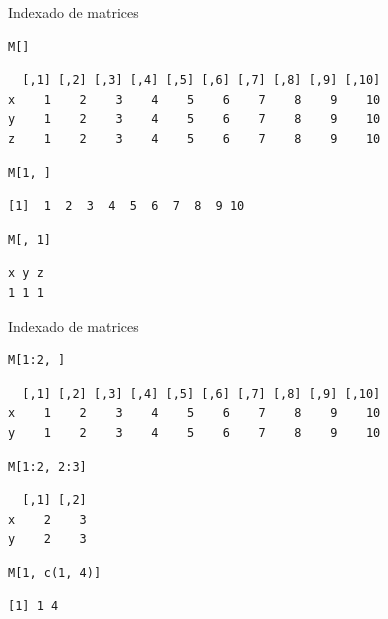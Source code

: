\documentclass[xcolor={usenames,svgnames,dvipsnames}]{beamer}
\begin{document}
\begin{frame}[fragile,label=sec-2-2-4]{Indexado de matrices}
 \lstset{language=R,label= ,caption= ,numbers=none}
\begin{lstlisting}
M[]
\end{lstlisting}

\begin{verbatim}
  [,1] [,2] [,3] [,4] [,5] [,6] [,7] [,8] [,9] [,10]
x    1    2    3    4    5    6    7    8    9    10
y    1    2    3    4    5    6    7    8    9    10
z    1    2    3    4    5    6    7    8    9    10
\end{verbatim}

\lstset{language=R,label= ,caption= ,numbers=none}
\begin{lstlisting}
M[1, ]
\end{lstlisting}

\begin{verbatim}
[1]  1  2  3  4  5  6  7  8  9 10
\end{verbatim}

\lstset{language=R,label= ,caption= ,numbers=none}
\begin{lstlisting}
M[, 1]
\end{lstlisting}

\begin{verbatim}
x y z 
1 1 1
\end{verbatim}
\end{frame}

\begin{frame}[fragile,label=sec-2-2-5]{Indexado de matrices}
 \lstset{language=R,label= ,caption= ,numbers=none}
\begin{lstlisting}
M[1:2, ]
\end{lstlisting}

\begin{verbatim}
  [,1] [,2] [,3] [,4] [,5] [,6] [,7] [,8] [,9] [,10]
x    1    2    3    4    5    6    7    8    9    10
y    1    2    3    4    5    6    7    8    9    10
\end{verbatim}

\lstset{language=R,label= ,caption= ,numbers=none}
\begin{lstlisting}
M[1:2, 2:3]
\end{lstlisting}

\begin{verbatim}
  [,1] [,2]
x    2    3
y    2    3
\end{verbatim}

\lstset{language=R,label= ,caption= ,numbers=none}
\begin{lstlisting}
M[1, c(1, 4)]
\end{lstlisting}

\begin{verbatim}
[1] 1 4
\end{verbatim}
\end{frame}
\end{document}
